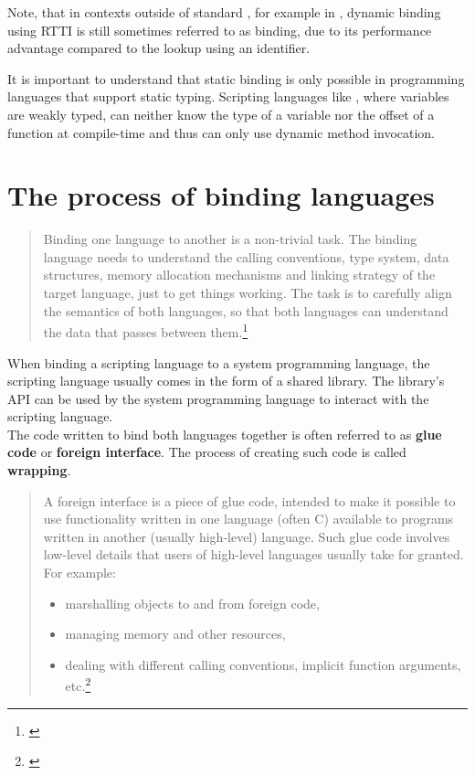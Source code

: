 Note, that in contexts outside of standard , for example in , dynamic binding using RTTI is still sometimes referred to as  binding, due to its performance advantage compared to the lookup using an identifier.

It is important to understand that static binding is only possible in programming languages that support static typing. Scripting languages like , where variables are weakly typed, can neither know the type of a variable nor the offset of a function at compile-time and thus can only use dynamic method invocation.

\section{The process of binding languages}

\begin{quotation}
Binding one language to another is a non-trivial task. The binding language needs to understand the calling conventions, type system, data structures, memory allocation mechanisms and linking strategy of the target language, just to get things working. The task is to carefully align the semantics of both languages, so that both languages can understand the data that passes between them.\footnote{\citep{RealWorldHaskell}}
\end{quotation}

When binding a scripting language to a system programming language, the scripting language usually comes in the form of a shared library. The library's API can be used by the system programming language to interact with the scripting language.\\
The code written to bind both languages together is often referred to as \textbf{glue code} or \textbf{foreign interface}. The process of creating such code is called \textbf{wrapping}.

\begin{quotation}
A foreign interface is a piece of glue code, intended to make it possible to use functionality written in one language (often C) available to programs written in another (usually high-level) language. Such glue code involves low-level details that users of high-level languages usually take for granted. For example:
\begin{itemize}
\item marshalling objects to and from foreign code,
\item managing memory and other resources,
\item dealing with different calling conventions, implicit function arguments, etc.\footnote{\citep{FFIScheme}}
\end{itemize}
\end{quotation}

